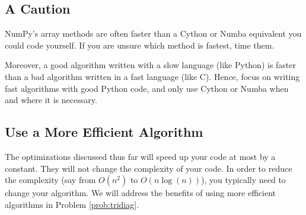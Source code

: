 \subsection*{A Caution}
NumPy's array methods are often faster than a Cython or Numba equivalent you could code yourself.
If you are unsure which method is fastest, time them.

Moreover, a good algorithm written with a slow language (like Python) is faster than a bad algorithm written in a fast language (like C).
Hence, focus on writing fast algorithms with good Python code, and only use Cython  or Numba when and where it is necessary.

\subsection*{Use a More Efficient Algorithm}
The optimizations discussed thus far will speed up your code at most by a constant.
They will not change the complexity of your code.
In order to reduce the complexity (say from $O(n^2)$ to $O(n \log(n))$), you typically need to change your algorithm.
We will address the benefits of using more efficient algorithms in Problem \ref{prob:tridiag}.

\begin{comment}
\begin{problem}
Optimize the following function using techniques described in this lab:
\begin{lstlisting}
# TODO: COME UP WITH SOME ALGORITHM TO DO HERE!!
\end{lstlisting}
It should also include a list of changes, the reasoning behind the changes, and the effect of the changes on runtime. On the author's computer, computing the LU-decomposition on a 1000x1000 matrix took over 2 and a half minutes. The optimized version took a little over a second.

Hint: The best way to approach this problem is to analyze what each piece of code is actually doing. Then, determine if there is a more efficient way to accomplish the same task. Specifically, look for ways to use array operations instead of for loops, ways to replace blocks of code with built-in Python functions, and ways to avoid recomputing values.
\end{problem}
\end{comment}

